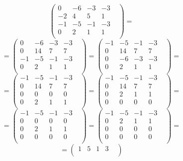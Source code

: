 \documentclass[a4paper,12pt]{article}
\begin{document}
\begin{itemize}
\[\begin{pmatrix}
0 & -6 & -3 & -3 & \\
-2 & 4 & 5 & 1 & \\
-1 & -5 & -1 & -3 & \\
0 & 2 & 1 & 1 & \\
\end{pmatrix}
=
\]
\[
=
\begin{pmatrix}
0 & -6 & -3 & -3 & \\
0 & 14 & 7 & 7 & \\
-1 & -5 & -1 & -3 & \\
0 & 2 & 1 & 1 & \\
\end{pmatrix}
=
\begin{pmatrix}
-1 & -5 & -1 & -3 & \\
0 & 14 & 7 & 7 & \\
0 & -6 & -3 & -3 & \\
0 & 2 & 1 & 1 & \\
\end{pmatrix}
=
\]
\[
=
\begin{pmatrix}
-1 & -5 & -1 & -3 & \\
0 & 14 & 7 & 7 & \\
0 & 0 & 0 & 0 & \\
0 & 2 & 1 & 1 & \\
\end{pmatrix}
=
\begin{pmatrix}
-1 & -5 & -1 & -3 & \\
0 & 14 & 7 & 7 & \\
0 & 2 & 1 & 1 & \\
0 & 0 & 0 & 0 & \\
\end{pmatrix}
=
\]
\[
=
\begin{pmatrix}
-1 & -5 & -1 & -3 & \\
0 & 0 & 0 & 0 & \\
0 & 2 & 1 & 1 & \\
0 & 0 & 0 & 0 & \\
\end{pmatrix}
=
\begin{pmatrix}
-1 & -5 & -1 & -3 & \\
0 & 2 & 1 & 1 & \\
0 & 0 & 0 & 0 & \\
0 & 0 & 0 & 0 & \\
\end{pmatrix}
=
\]
\begin{equation*}
\label{fcr_l2}
=
\begin{pmatrix}
1 & 5 & 1 & 3 & \\

\end{pmatrix}
\end{equation*}
\end{itemize}
\end{document}
